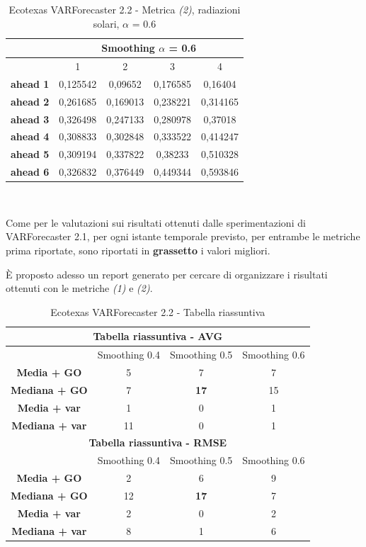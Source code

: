 \documentclass[12pt,a4paper,oneside,openright]{book}
\begin{document}
\medskip

\begin{table}[H]
\centering
\begin{tabular}{|c|c|c|c|c|}
\hline
 & \multicolumn{4}{|c|}{Smoothing $\alpha$ = 0.6} \\
\hline
& 1 & 2 & 3 & 4 \\
\hline
\textbf{ahead 1} & 0,125542 & 0,09652 & 0,176585 & 0,16404\\
\hline
\textbf{ahead 2} & 0,261685 & 0,169013 & 0,238221 & 0,314165\\ 
\hline
\textbf{ahead 3} & 0,326498 & 0,247133 & 0,280978 & 0,37018\\
\hline
\textbf{ahead 4} & 0,308833 & 0,302848 & 0,333522 & 0,414247\\ 
\hline
\textbf{ahead 5} & 0,309194 & 0,337822 & 0,38233 & 0,510328\\
\hline
\textbf{ahead 6} & 0,326832 & 0,376449 & 0,449344 & 0,593846\\ 
\hline
\end{tabular} \\
\caption{Ecotexas VARForecaster 2.2 - Metrica \textit{(2)}, radiazioni solari, $\alpha$ = 0.6}
\end{table}

Come per le valutazioni sui risultati ottenuti dalle sperimentazioni di VARForecaster 2.1, per ogni istante temporale previsto, per entrambe le metriche prima riportate, sono riportati in \textbf{grassetto} i valori migliori. 

È proposto adesso un report generato per cercare di organizzare i risultati ottenuti con le metriche \textit{(1)} e \textit{(2)}.

\begin{table}[H]
\centering
\begin{tabular}{|c|c|c|c|}
\hline
\multicolumn{4}{|c|}{\textbf{Tabella riassuntiva - AVG}} \\
\hline
& Smoothing 0.4 & Smoothing 0.5 & Smoothing 0.6 \\
\hline
\textbf{Media + GO} & 5 & 7 & 7\\ 
\hline
\textbf{Mediana + GO} & 7 & \textbf{17} & 15\\ 
\hline
\textbf{Media + var} & 1 & 0 & 1\\ 
\hline
\textbf{Mediana + var} & 11 & 0 & 1\\ 
\hline
\multicolumn{4}{|c|}{\textbf{Tabella riassuntiva - RMSE}} \\
\hline
& Smoothing 0.4 & Smoothing 0.5 & Smoothing 0.6 \\
\hline
\textbf{Media + GO} & 2 & 6 & 9\\ 
\hline
\textbf{Mediana + GO} & 12 & \textbf{17} & 7\\ 
\hline
\textbf{Media + var} & 2 & 0 & 2\\ 
\hline
\textbf{Mediana + var} & 8 & 1 & 6\\ 
\hline
\end{tabular} \\
\caption{Ecotexas VARForecaster 2.2 - Tabella riassuntiva}
\end{table}
\end{document}
